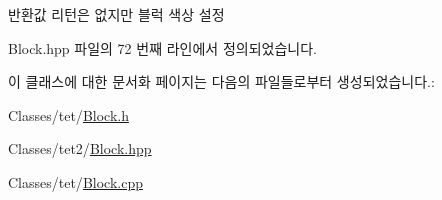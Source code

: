\begin{DoxyReturn}{반환값}
리턴은 없지만 블럭 색상 설정 
\end{DoxyReturn}


Block.\+hpp 파일의 72 번째 라인에서 정의되었습니다.



이 클래스에 대한 문서화 페이지는 다음의 파일들로부터 생성되었습니다.\+:\begin{DoxyCompactItemize}
\item 
Classes/tet/\hyperlink{_block_8h}{Block.\+h}\item 
Classes/tet2/\hyperlink{_block_8hpp}{Block.\+hpp}\item 
Classes/tet/\hyperlink{_block_8cpp}{Block.\+cpp}\end{DoxyCompactItemize}
